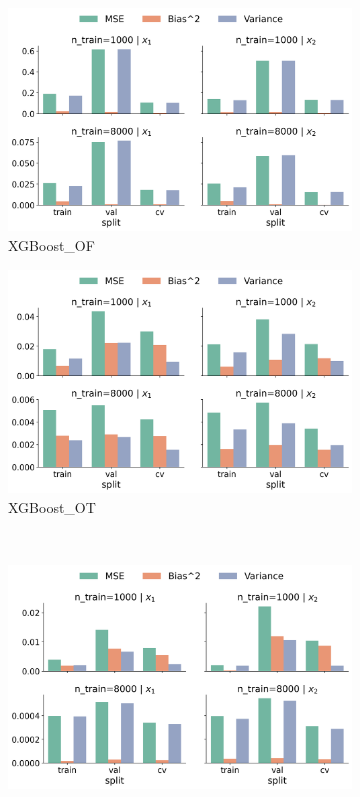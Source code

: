 \documentclass[runningheads]{llncs}
\begin{document}
\begin{figure}[htbp]
\begin{subfigure}[b]{0.49\textwidth}
        \includegraphics[width=\textwidth]{img/SNC/feature_effect_errors_ale_XGBoost_OF.png}
        \caption{XGBoost\_OF}
        \label{fig:ale-results-snc-xgboost-of}  %
    \end{subfigure}
    \hfill
    \begin{subfigure}[b]{0.49\textwidth}
        \includegraphics[width=\textwidth]{img/SNC/feature_effect_errors_ale_XGBoost_OT.png}
        \caption{XGBoost\_OT}
        \label{fig:ale-results-snc-xgboost-ot}  %
    \end{subfigure}
    \\[10pt]
    \vfill
    \begin{subfigure}[b]{0.49\textwidth}
        \includegraphics[width=\textwidth]{img/SNC/feature_effect_errors_ale_SVM_OT.png}

\end{subfigure}
\end{figure}
\end{document}
